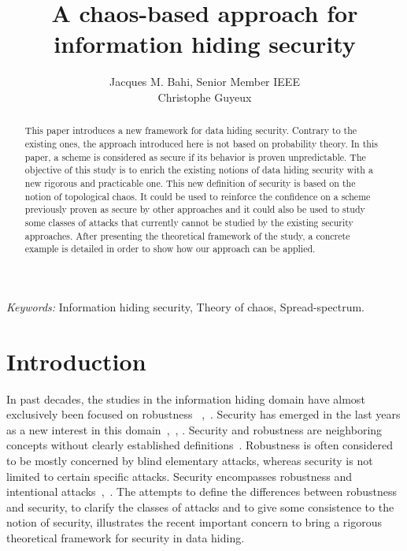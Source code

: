 \documentclass{llncs}
\begin{document}
\title{A chaos-based approach for information hiding security}
\author{Jacques M. Bahi, Senior Member IEEE\\Christophe Guyeux} 
\maketitle


\begin{abstract}
This paper introduces a new framework for data hiding security. Contrary to the existing ones, the approach introduced here is not based on probability theory. In this paper, a scheme is considered as secure if its behavior is proven unpredictable. The objective of this study is to enrich the existing notions of data hiding security with a new rigorous and practicable one. This new definition of security is based on the notion of topological chaos. It could be used to reinforce the confidence on a scheme previously proven as secure by other approaches and it could also be used to study some classes of attacks that currently cannot be studied by the existing security approaches. After presenting the theoretical framework of the study, a concrete example is detailed in order to show how our approach can be applied.
\end{abstract}

\emph{Keywords:} Information hiding security, Theory of chaos, Spread-spectrum.

\section{Introduction}

In past decades, the studies in the information hiding domain have almost exclusively been focused on robustness ~\cite{AdelsbachKS06},~\cite{BattiatoCGG99}. Security has emerged in the last years as a new interest in this domain~\cite{Cachin2004},~\cite{Mittelholzer99}, \cite{Perez-Freire2006:Security}. Security and robustness are neighboring concepts without clearly established definitions~\cite{Perez-Freire06}. Robustness is often considered to be mostly concerned by blind elementary attacks, whereas security is not limited to certain specific attacks. Security encompasses robustness and intentional attacks~\cite{ComesanaPP05bis},~\cite{Kalker2001}. The attempts to define the differences between robustness and security, to clarify the classes of attacks and to give some consistence to the notion of security, illustrates the recent important concern to bring a rigorous theoretical framework for security in data hiding.
\end{document}
